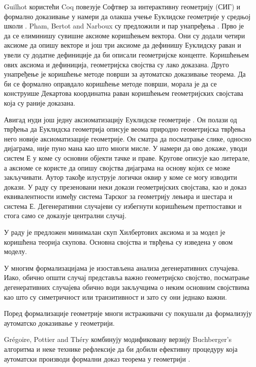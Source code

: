 Guilhot користећи Coq повезује Софтвер за интерактивну геометрију
(СИГ) и формално доказивање у намери да олакша учење Еуклидске
геометрије у средњој школи \cite{guilhot}. Pham, Bertot and Narboux су
предложили и пар унапређења \cite{coqly}. Прво је да се елиминишу
сувишне аксиоме коришћењем вектора. Они су додали четири аксиоме да
опишу векторе и још три аксиоме да дефинишу Еуклидску раван и увели су
додатне дефиниције да би описали геометријске концепте. Коришћењем
ових аксиома и дефиниција, геометријска својства су лако
доказана. Друго унапређење је коришћење методе површи за аутоматско
доказивање теорема. Да би се формално оправдало коришћење методе
површи, морала је да се конструише Декартова координатна раван
коришћењем геометријских својстава која су раније доказана.

Авигад нуди још једну аксиоматизацију Еуклидске геометрије
\cite{avigad}. Он полази од тврђења да Еуклидска геометрија описује
веома природно геометријска тврђења него новије аксиоматизације
геометрије. Он сматра да посматрање слике, односно дијаграма, није
пуно мана као што многи мисле. У намери да ово докаже, уводи систем Е
у коме су основни објекти тачке и праве. Кругове описује као литерале,
а аксиоме се користе да опишу својства дијаграма на основу којих се
може закључивати. Аутор такође илуструје логички оквир у коме се могу
изводити докази. У раду су презеновани неки докази геометријских
својстава, као и доказ еквивалентности између система Тарског за
геометрију лењира и шестара и система Е. Дегенеративни случајеви су
избегнути коришћењем претпоставки и стога само се доказује централни
случај.

У раду \cite{william} је предложен минималан скуп Хилбертових аксиома
и за модел је коришћена теорија скупова. Основна својства и тврђења су
изведена у овом моделу.

У многим формализацијама је изостављена анализа дегенеративних
случајева. Иако, обично општи случај представља важно геометријско
својство, посматрање дегенеративних случајева обично води закључцима о
неким основним својствима као што су симетричност или транзитивност и
зато су они једнако важни.

Поред формализације геометрије многи истраживачи су покушали да
формализују аутоматско доказивање у геометрији.

Gr\'egoire, Pottier and Th\'ery комбинују модификовану верзију
Buchberger’s алгоритма и неке технике рефлексије да би добили
ефективну процедуру која аутоматски производи формални доказ теорема у
геометрији \cite{grobnercoq}.

